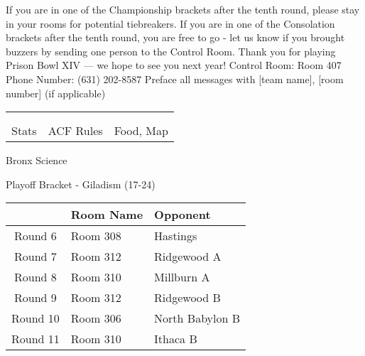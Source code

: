 \documentclass{article}%
\begin{document}
\vspace*{30pt}%
\linebreak%
If you are in one of the Championship brackets after the tenth round, please stay in your rooms for potential tiebreakers.\newline%
\newline%
If you are in one of the Consolation brackets after the tenth round, you are free to go {-} let us know if you brought buzzers by sending one person to the Control Room.\newline%
\newline%
Thank you for playing Prison Bowl XIV — we hope to see you next year!\newline%
\newline%
Control Room: Room 407\newline%
Phone Number: (631) 202{-}8587\newline%
Preface all messages with {[}team name{]}, {[}room number{]} (if applicable)%
\vspace*{30pt}%
\newline%
%
\begin{tabularx}{\textwidth}{YYY}%
  &  &  \\%
\\%
Stats&ACF Rules&Food, Map\\%
\end{tabularx}%
\newpage%
\begin{center}%
\begin{Huge}%
Bronx Science%
\end{Huge}%
\vspace*{12pt}%
\linebreak%
\begin{Large}%
Playoff Bracket {-} Giladism (17{-}24)%
\end{Large}%
\end{center}%
\vspace*{4pt}%
%
\begin{tabularx}{\textwidth}{|c|Y|Y|}%
\hline%
&Room Name&Opponent\\%
\hline%
Round 6&Room 308&Hastings\\%
Round 7&Room 312&Ridgewood A\\%
Round 8&Room 310&Millburn A\\%
Round 9&Room 312&Ridgewood B\\%
Round 10&Room 306&North Babylon B\\%
Round 11&Room 310&Ithaca B\\%
\hline%
\end{tabularx}%
\end{document}

